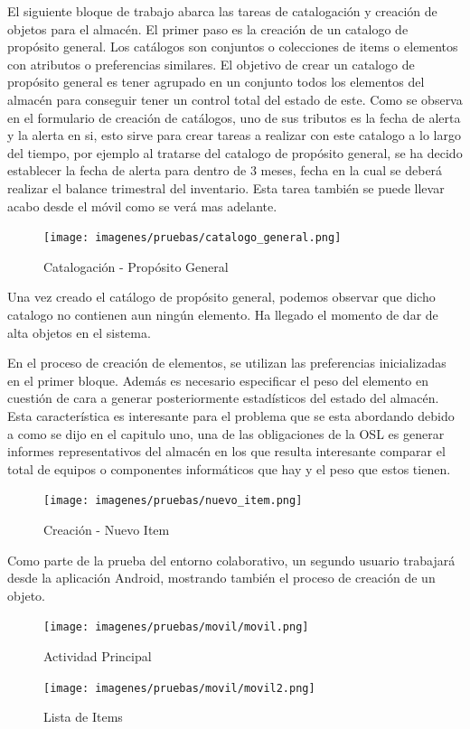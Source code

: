 \documentclass[a4paper,11pt]{book}
\begin{document}
El siguiente bloque de trabajo abarca las tareas de catalogación y creación de objetos para el almacén. El primer paso es la creación de un catalogo de propósito general. Los catálogos son conjuntos o colecciones de items o elementos con atributos o preferencias similares. El objetivo de crear un catalogo de propósito general es tener agrupado en un conjunto todos los elementos del almacén para conseguir tener un control total del estado de este. Como se observa en el formulario de creación de catálogos, uno de sus tributos es la fecha de alerta y la alerta en si, esto sirve para crear tareas a realizar con este catalogo a lo largo del tiempo, por ejemplo al tratarse del catalogo de propósito general, se ha decido establecer la fecha de alerta para dentro de 3 meses, fecha en la cual se deberá realizar el balance trimestral del inventario. Esta tarea también se puede llevar acabo desde el móvil como se verá mas adelante. 

\begin{figure}[H] 
\centering 
\texttt{[image: imagenes/pruebas/catalogo\_general.png]}
\caption{ Catalogación - Propósito General\cite{propio}}
\end{figure}

Una vez creado el catálogo de propósito general, podemos observar que dicho catalogo no contienen aun ningún elemento. Ha llegado el momento de dar de alta objetos en el sistema. 

En el proceso de creación de elementos, se utilizan las preferencias inicializadas en el primer bloque. Además es necesario especificar el peso del elemento en cuestión de cara a generar posteriormente estadísticos del estado del almacén. Esta característica es interesante para el problema que se esta abordando debido a como se dijo en el capitulo uno, una de las obligaciones de la OSL es generar informes representativos del almacén en los que resulta interesante comparar el total de equipos o componentes informáticos que hay y el peso que estos tienen. 
\begin{figure}[H] 
\centering 
\texttt{[image: imagenes/pruebas/nuevo\_item.png]}
\caption{ Creación - Nuevo Item\cite{propio}}
\end{figure}

Como parte de la prueba del entorno colaborativo, un segundo usuario trabajará desde la aplicación Android, mostrando también el proceso de creación de un objeto. 



\begin{figure}[H]
  \texttt{[image: imagenes/pruebas/movil/movil.png]}
  \caption{Actividad Principal\cite{propio}}
\endminipage\hfill
{}
  \texttt{[image: imagenes/pruebas/movil/movil2.png]}
  \caption{Lista de Items\cite{propio}}
\endminipage\hfill
\end{figure}
\end{document}
